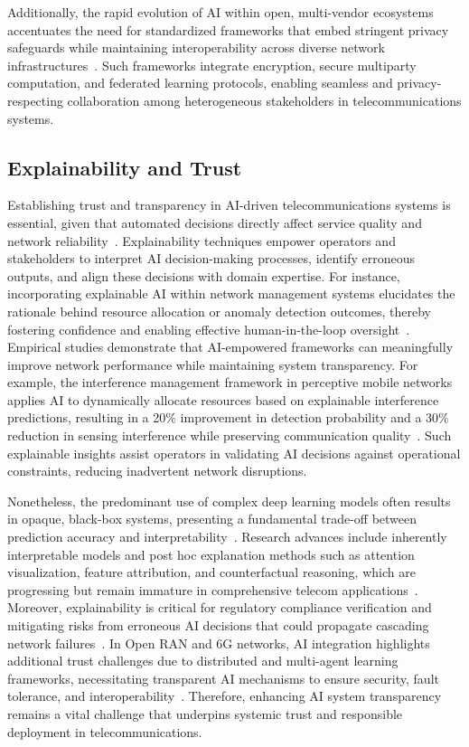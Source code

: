 \documentclass[sigconf]{acmart}
\begin{document}
Additionally, the rapid evolution of AI within open, multi-vendor ecosystems accentuates the need for standardized frameworks that embed stringent privacy safeguards while maintaining interoperability across diverse network infrastructures~\cite{ref48,ref52}. Such frameworks integrate encryption, secure multiparty computation, and federated learning protocols, enabling seamless and privacy-respecting collaboration among heterogeneous stakeholders in telecommunications systems.

\subsection{Explainability and Trust}

Establishing trust and transparency in AI-driven telecommunications systems is essential, given that automated decisions directly affect service quality and network reliability~\cite{ref7,ref48,ref50,ref54}. Explainability techniques empower operators and stakeholders to interpret AI decision-making processes, identify erroneous outputs, and align these decisions with domain expertise. For instance, incorporating explainable AI within network management systems elucidates the rationale behind resource allocation or anomaly detection outcomes, thereby fostering confidence and enabling effective human-in-the-loop oversight~\cite{ref7}. Empirical studies demonstrate that AI-empowered frameworks can meaningfully improve network performance while maintaining system transparency. For example, the interference management framework in perceptive mobile networks applies AI to dynamically allocate resources based on explainable interference predictions, resulting in a 20\% improvement in detection probability and a 30\% reduction in sensing interference while preserving communication quality~\cite{ref48}. Such explainable insights assist operators in validating AI decisions against operational constraints, reducing inadvertent network disruptions.

Nonetheless, the predominant use of complex deep learning models often results in opaque, black-box systems, presenting a fundamental trade-off between prediction accuracy and interpretability~\cite{ref54}. Research advances include inherently interpretable models and post hoc explanation methods such as attention visualization, feature attribution, and counterfactual reasoning, which are progressing but remain immature in comprehensive telecom applications~\cite{ref50}. Moreover, explainability is critical for regulatory compliance verification and mitigating risks from erroneous AI decisions that could propagate cascading network failures~\cite{ref48}. In Open RAN and 6G networks, AI integration highlights additional trust challenges due to distributed and multi-agent learning frameworks, necessitating transparent AI mechanisms to ensure security, fault tolerance, and interoperability~\cite{ref54}. Therefore, enhancing AI system transparency remains a vital challenge that underpins systemic trust and responsible deployment in telecommunications.
\end{document}
